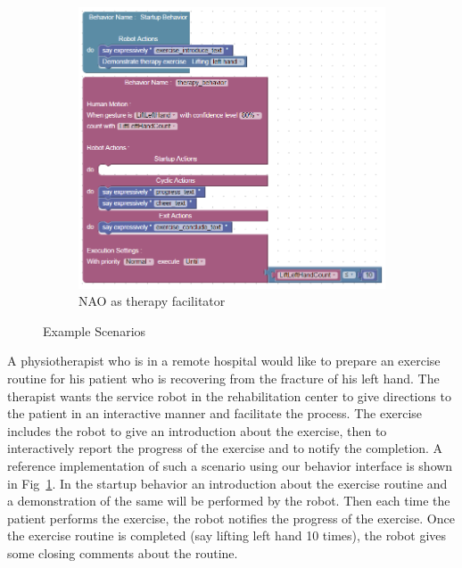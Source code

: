 \documentclass{llncs}
\begin{document}
\begin{figure}
\begin{subfigure}[t]{0.7\textwidth}
\includegraphics[width=\textwidth]{../thesis/assets/scenario2.png}
\caption[NAO as therapy facilitator]{NAO as therapy facilitator}
\label{fig:scenario2_program}
\end{subfigure}
\caption[Example Scenarios]{Example Scenarios}
\label{fig:scenarios}
\end{figure}
A physiotherapist who is in a remote hospital would like to prepare an exercise routine for his patient who is recovering from the fracture of his left hand. The therapist wants the service robot in the rehabilitation center to give directions to the patient in an interactive manner and facilitate the process. The exercise includes the robot to give an introduction about the exercise, then to interactively report the progress of the exercise and to notify the completion. A reference implementation of such a scenario using our behavior interface is shown in Fig~\ref{fig:scenario2_program}. In the startup behavior an introduction about the exercise routine and a demonstration of the same will be performed by the robot. Then each time the patient performs the exercise, the robot notifies the progress of the exercise. Once the exercise routine is completed (say lifting left hand 10 times), the robot gives some closing comments about the routine.
\end{document}
